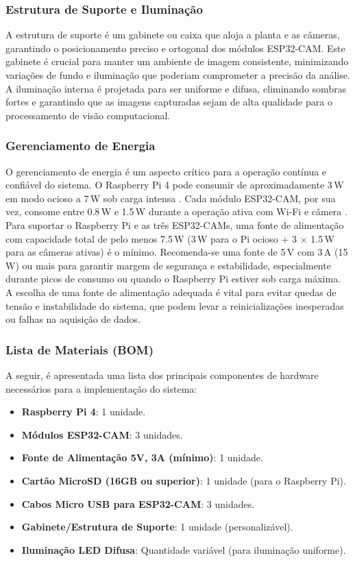 \documentclass[12pt, a4paper]{article}
\begin{document}
	\subsubsection{Estrutura de Suporte e Iluminação}
	A estrutura de suporte é um gabinete ou caixa que aloja a planta e as câmeras, garantindo o posicionamento preciso e ortogonal dos módulos ESP32-CAM. Este gabinete é crucial para manter um ambiente de imagem consistente, minimizando variações de fundo e iluminação que poderiam comprometer a precisão da análise. A iluminação interna é projetada para ser uniforme e difusa, eliminando sombras fortes e garantindo que as imagens capturadas sejam de alta qualidade para o processamento de visão computacional.
	
	\subsubsection{Gerenciamento de Energia}
	O gerenciamento de energia é um aspecto crítico para a operação contínua e confiável do sistema. O Raspberry Pi 4 pode consumir de aproximadamente 3\,W em modo ocioso a 7\,W sob carga intensa \cite{RaspberryPi4Power}. Cada módulo ESP32-CAM, por sua vez, consome entre 0.8\,W e 1.5\,W durante a operação ativa com Wi-Fi e câmera \cite{ESP32CAMPower}. Para suportar o Raspberry Pi e as três ESP32-CAMs, uma fonte de alimentação com capacidade total de pelo menos 7.5\,W (3\,W para o Pi ocioso + 3 $\times$ 1.5\,W para as câmeras ativas) é o mínimo. Recomenda-se uma fonte de 5\,V com 3\,A (15\,W) ou mais para garantir margem de segurança e estabilidade, especialmente durante picos de consumo ou quando o Raspberry Pi estiver sob carga máxima. A escolha de uma fonte de alimentação adequada é vital para evitar quedas de tensão e instabilidade do sistema, que podem levar a reinicializações inesperadas ou falhas na aquisição de dados.
	
	\subsubsection{Lista de Materiais (BOM)}
	A seguir, é apresentada uma lista dos principais componentes de hardware necessários para a implementação do sistema:
	\begin{itemize}
		\item \textbf{Raspberry Pi 4}: 1 unidade.
		\item \textbf{Módulos ESP32-CAM}: 3 unidades.
		\item \textbf{Fonte de Alimentação 5V, 3A (mínimo)}: 1 unidade.
		\item \textbf{Cartão MicroSD (16GB ou superior)}: 1 unidade (para o Raspberry Pi).
		\item \textbf{Cabos Micro USB para ESP32-CAM}: 3 unidades.
		\item \textbf{Gabinete/Estrutura de Suporte}: 1 unidade (personalizável).
		\item \textbf{Iluminação LED Difusa}: Quantidade variável (para iluminação uniforme).
	\end{itemize}
	
\end{document}
